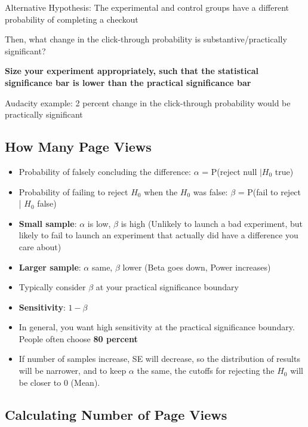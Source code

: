 \documentclass[10pt]{article}
\theoremstyle{definition}
\begin{document}
Alternative Hypothesis: The experimental and control groups have a different probability of completing a checkout

Then, what change in the click-through probability is substantive/practically significant?

\textbf{Size your experiment appropriately, such that the statistical significance bar is lower than the practical significance bar}

Audacity example: 2 percent change in the click-through probability would be practically significant

\subsection{How Many Page Views} 

\begin{itemize}
    \item Probability of falsely concluding the difference: \textbf{$\alpha$} = P(reject null $| H_{0}$ true)
    \item Probability of failing to reject $H_{0}$ when the $H_{0}$ was false: \textbf{$\beta$} = P(fail to reject | $H_{0}$ false)
    \item \textbf{Small sample}: $\alpha$ is low, $\beta$ is high (Unlikely to launch a bad experiment, but likely to fail to launch an experiment that actually did have a difference you care about)
    \item \textbf{Larger sample}: $\alpha$ same, $\beta$ lower (Beta goes down, Power increases)
    \item Typically consider $\beta$ at your practical significance boundary
    \item \textbf{Sensitivity}: $1-\beta$
    \item In general, you want high sensitivity at the practical significance boundary. People often choose \textbf{80 percent}
    \item If number of samples increase, SE will decrease, so the distribution of results will be narrower, and to keep $\alpha$ the same, the cutoffs for rejecting the $H_{0}$ will be closer to 0 (Mean). 
\end{itemize}

\subsection{Calculating Number of Page Views}
\end{document}
